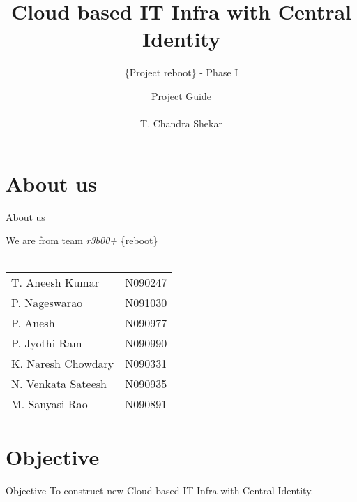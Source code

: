 \documentclass[xcolor=dvipsnames]{beamer}
\title[Cloud based IT Infra with Central Identity]{Cloud based IT Infra with Central Identity}
\subtitle{\{Project reboot\} - Phase I  }
\author{ \underline{Project Guide} \\ \hspace{2mm} \\ \small{ T. Chandra Shekar }  }
\institute{ \underline{Presenting by} \\ \hspace{2mm} \\ \textit {Team r3b00+ }  \\ \hspace{4mm} \\ \textit{Dept. of CSE, RGUKT - Nuzvid}}
\begin{document}
\begin{frame}
\titlepage
\end{frame}





\section{About us}
\begin{frame}{About us}

\small
\begin{center}
We are from team \textit{r3b00+}  \{reboot\} \\ \hspace{4cm} \\
\begin{tabular}{l  l }
T. Aneesh Kumar & N090247   \\
P. Nageswarao  & N091030  \\
P. Anesh  & N090977 \\
P. Jyothi Ram & N090990 \\
K. Naresh Chowdary  & N090331 \\
N. Venkata Sateesh  & N090935 \\
M. Sanyasi Rao & N090891  
\end{tabular}


\end{center}


\end{frame}

\section{Objective}
\begin{frame}{Objective}
To construct new Cloud based IT Infra with Central Identity.
\end{frame}
\end{document}

